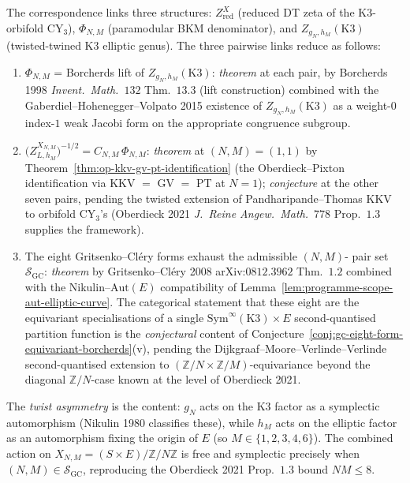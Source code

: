 \begin{remark}
\label{rem:gc-three-equivalences-reduction}
The correspondence links three structures:
$Z^X_{\mathrm{red}}$ (reduced DT zeta of the K3-orbifold CY$_3$),
$\Phi_{N, M}$ (paramodular BKM denominator), and
$Z_{g_N, h_M}(\mathrm{K3})$ (twisted-twined K3 elliptic genus). The
three pairwise links reduce as follows:
\begin{enumerate}[label=(\roman*), leftmargin=2em, itemsep=0.2ex]
\item $\Phi_{N, M}$ = Borcherds lift of $Z_{g_N, h_M}(\mathrm{K3})$:
\emph{theorem} at each pair, by
Borcherds 1998 \emph{Invent.\ Math.}~$132$ Thm.~$13.3$ (lift
construction) combined with the Gaberdiel--Hohenegger--Volpato 2015
existence of $Z_{g_N, h_M}(\mathrm{K3})$ as a weight-$0$ index-$1$ weak
Jacobi form on the appropriate congruence subgroup.
\item $\bigl(Z^{X_{N, M}}_{L, h_M}\bigr)^{-1/2} = C_{N, M}\,\Phi_{N, M}$:
\emph{theorem} at $(N, M) = (1, 1)$ by
Theorem~\ref{thm:op-kkv-gv-pt-identification} (the Oberdieck--Pixton
identification via KKV $=$ GV $=$ PT at $N = 1$);
\emph{conjecture} at the other seven pairs, pending the twisted
extension of Pandharipande--Thomas KKV to orbifold CY$_3$'s
(Oberdieck 2021 \emph{J.\ Reine Angew.\ Math.}~$778$ Prop.~$1.3$
supplies the framework).
\item The eight Gritsenko--Cl\'ery forms exhaust the admissible $(N,M)$-
pair set $\mathcal{S}_{\mathrm{GC}}$:
\emph{theorem} by Gritsenko--Cl\'ery 2008 arXiv:$0812.3962$ Thm.~$1.2$
combined with the Nikulin--$\mathrm{Aut}(E)$ compatibility of
Lemma~\ref{lem:programme-scope-aut-elliptic-curve}. The categorical
statement that these eight are the equivariant specialisations of a
single $\mathrm{Sym}^\infty(\mathrm{K3}) \times E$ second-quantised
partition function is the \emph{conjectural} content of
Conjecture~\ref{conj:gc-eight-form-equivariant-borcherds}(v),
pending the Dijkgraaf--Moore--Verlinde--Verlinde second-quantised
extension to $(\mathbb{Z}/N \times \mathbb{Z}/M)$-equivariance
beyond the diagonal $\mathbb{Z}/N$-case known at the level of
Oberdieck 2021.
\end{enumerate}
The \emph{twist asymmetry} is the content: $g_N$ acts on the K3
factor as a symplectic automorphism (Nikulin 1980 classifies these),
while $h_M$ acts on the elliptic factor as an automorphism fixing the
origin of $E$ (so $M \in \{1, 2, 3, 4, 6\}$). The combined action on
$X_{N, M} = (S \times E)/\mathbb{Z}/N\mathbb{Z}$ is free and
symplectic precisely when $(N, M) \in \mathcal{S}_{\mathrm{GC}}$,
reproducing the Oberdieck 2021 Prop.~$1.3$ bound $N M \leq 8$.
\end{remark}

